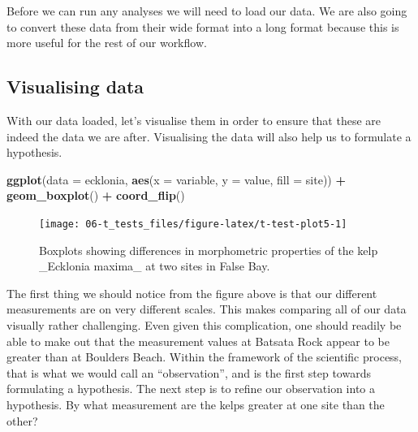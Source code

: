 \documentclass[english,10pt,a4paper,oneside]{book}
\newenvironment{Shaded}{\begin{snugshade}}{\end{snugshade}}
\newcommand{\KeywordTok}[1]{\textcolor[rgb]{0.13,0.29,0.53}{\textbf{#1}}}
\newcommand{\DataTypeTok}[1]{\textcolor[rgb]{0.13,0.29,0.53}{#1}}
\newcommand{\StringTok}[1]{\textcolor[rgb]{0.31,0.60,0.02}{#1}}
\newcommand{\OperatorTok}[1]{\textcolor[rgb]{0.81,0.36,0.00}{\textbf{#1}}}
\newcommand{\NormalTok}[1]{#1}
\theoremstyle{definition}
\theoremstyle{definition}
\theoremstyle{definition}
\theoremstyle{remark}
\begin{document}
Before we can run any analyses we will need to load our data. We are
also going to convert these data from their wide format into a long
format because this is more useful for the rest of our workflow.

\begin{Shaded}
\end{Shaded}

\subsection{Visualising data}\label{visualising-data}

With our data loaded, let's visualise them in order to ensure that these
are indeed the data we are after. Visualising the data will also help us
to formulate a hypothesis.

\begin{Shaded}
\begin{Highlighting}[]
\KeywordTok{ggplot}\NormalTok{(}\DataTypeTok{data =}\NormalTok{ ecklonia, }\KeywordTok{aes}\NormalTok{(}\DataTypeTok{x =}\NormalTok{ variable, }\DataTypeTok{y =}\NormalTok{ value, }\DataTypeTok{fill =}\NormalTok{ site)) }\OperatorTok{+}
\StringTok{  }\KeywordTok{geom_boxplot}\NormalTok{() }\OperatorTok{+}
\StringTok{  }\KeywordTok{coord_flip}\NormalTok{()}
\end{Highlighting}
\end{Shaded}

\begin{figure}
\texttt{[image: 06-t\_tests\_files/figure-latex/t-test-plot5-1]} \caption{Boxplots showing differences in morphometric properties of the kelp _Ecklonia maxima_ at two sites in False Bay.}\label{fig:t-test-plot5}
\end{figure}

The first thing we should notice from the figure above is that our
different measurements are on very different scales. This makes
comparing all of our data visually rather challenging. Even given this
complication, one should readily be able to make out that the
measurement values at Batsata Rock appear to be greater than at Boulders
Beach. Within the framework of the scientific process, that is what we
would call an \enquote{observation}, and is the first step towards
formulating a hypothesis. The next step is to refine our observation
into a hypothesis. By what measurement are the kelps greater at one site
than the other?
\end{document}
